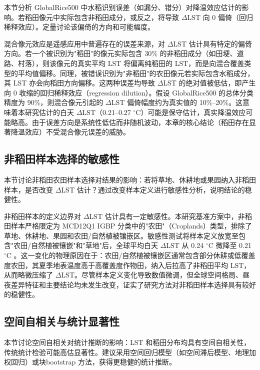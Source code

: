 本节分析 GlobalRice500 中水稻识别误差（如漏分、错分）对降温效应估计的影响。若稻田像元中实际包含非稻田成分，或反之，将导致 $\Delta$LST 向 0 偏倚（回归稀释效应）。定量讨论该偏倚的方向和可能幅度。

混合像元效应是遥感应用中普遍存在的误差来源，对 $\Delta$LST 估计具有特定的偏倚方向。若一个被识别为"稻田"的像元实际包含 30\% 的非稻田成分（如田埂、道路、村落），则该像元的真实平均 LST 将偏离纯稻田的 LST，而是向混合覆盖类型的平均值偏移。同理，被错误识别为"非稻田"的农田像元若实际包含水稻成分，其 LST 亦会向稻田方向偏移。这两种误差均导致 $\Delta$LST 的绝对值被低估，即产生向 0 收缩的回归稀释效应（regression dilution）\cite{Weng2025}。假设 GlobalRice500 的总体分类精度为 90\%，则混合像元引起的 $\Delta$LST 偏倚幅度约为真实值的 10\%--20\%。这意味着本研究估计的白天 $\Delta$LST（0.21--0.27 $^{\circ}\mathrm{C}$）可能是保守估计，真实降温效应可能略高。由于误差方向是系统性低估而非随机波动，本章的核心结论（稻田存在显著降温效应）不受混合像元误差的威胁。

\subsection{非稻田样本选择的敏感性}

本节讨论非稻田农田样本选择对结果的影响：若将草地、休耕地或果园纳入非稻田样本，是否改变 $\Delta$LST 估计？通过改变样本定义进行敏感性分析，说明结论的稳健性。

非稻田样本的定义边界对 $\Delta$LST 估计具有一定敏感性。本研究基准方案中，非稻田样本严格限定为 MCD12Q1 IGBP 分类中的"农田"（Croplands）类型，排除了草地、休耕地、果园和农田/自然植被镶嵌区。敏感性测试将样本定义放宽至包含"农田/自然植被镶嵌"和"草地"后，全球平均白天 $\Delta$LST 从 0.24 $^{\circ}\mathrm{C}$ 微降至 0.21 $^{\circ}\mathrm{C}$ \cite{Weng2025}。这一变化的物理原因在于：农田/自然植被镶嵌区通常包含部分休耕或低覆盖度农田，其夏季地表温度高于高覆盖度作物田，纳入后拉高了非稻田平均 LST，从而略微压缩了 $\Delta$LST。尽管样本定义变化导致数值微调，但全球空间格局、昼夜差异特征和主要结论均未发生改变，证实了研究方法对非稻田样本选择具有较好的稳健性。

\subsection{空间自相关与统计显著性}

本节讨论空间自相关对统计推断的影响：LST 和稻田分布均具有空间自相关性，传统统计检验可能高估显著性。建议采用空间回归模型（如空间滞后模型、地理加权回归）或块bootstrap 方法，获得更稳健的统计推断。

